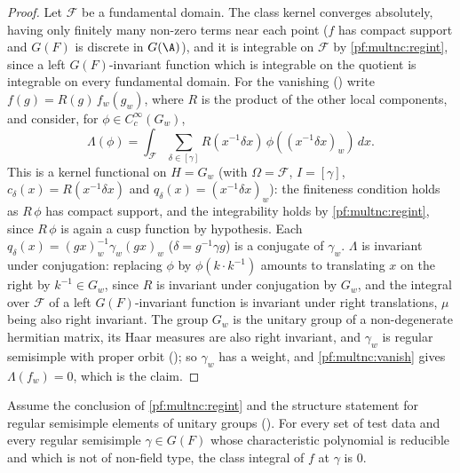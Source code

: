 \begin{proof}
Let $\mathcal F$ be a fundamental domain. The class kernel converges absolutely, having only finitely many non-zero terms
near each point ($f$ has compact support and $G(F)$ is discrete in $G(\A)$), and it is integrable on $\mathcal F$ by
\cref{pf:multnc:regint}, since a left $G(F)$-invariant function which is integrable on the quotient is integrable on every
fundamental domain. For the vanishing
() write $f(g)=R(g)\,f_w(g_w)$, where $R$ is the
product of the other local components, and consider, for $\phi\in C_c^\infty(G_w)$,
\[
\Lambda(\phi)=\int_{\mathcal F}\sum_{\delta\in[\gamma]}R(x^{-1}\delta x)\,\phi((x^{-1}\delta x)_w)\,dx .
\]
This is a kernel functional on $H=G_w$ (with $\Omega=\mathcal F$, $I=[\gamma]$, $c_\delta(x)=R(x^{-1}\delta x)$ and
$q_\delta(x)=(x^{-1}\delta x)_w$): the finiteness condition holds as $R\,\phi$ has compact support, and the integrability
holds by \cref{pf:multnc:regint}, since $R\,\phi$ is again a cusp function by hypothesis. Each
$q_\delta(x)=(gx)_w^{-1}\gamma_w(gx)_w$ ($\delta=g^{-1}\gamma g$) is a conjugate of $\gamma_w$. $\Lambda$ is invariant
under conjugation: replacing $\phi$ by $\phi(k\cdot k^{-1})$ amounts to translating $x$ on the right by $k^{-1}\in G_w$,
since $R$ is invariant under conjugation by $G_w$, and the integral over $\mathcal F$ of a left $G(F)$-invariant function
is invariant under right translations, $\mu$ being also right invariant. The group $G_w$ is the unitary group of a
non-degenerate hermitian matrix, its Haar measures are also right invariant, and $\gamma_w$ is regular semisimple with
proper orbit (); so $\gamma_w$ has a weight, and \cref{pf:multnc:vanish}
gives $\Lambda(f_w)=0$, which is the claim.
\end{proof}

\begin{lemma}\label{pf:multnc:hyperzero}
Assume the conclusion of \cref{pf:multnc:regint} and the structure statement for regular semisimple elements of unitary
groups (). For every set of test data and every regular
semisimple $\gamma\in G(F)$ whose characteristic polynomial is reducible and which is not of non-field type, the class
integral of $f$ at $\gamma$ is $0$.
\end{lemma}


